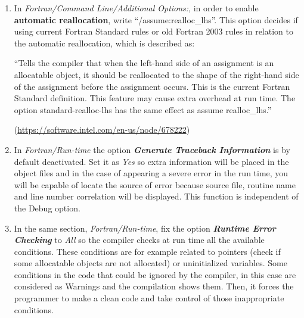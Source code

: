 \begin{enumerate}
    \item In \textit{Fortran/Command Line/Additional Options:}, in order to enable \textbf{automatic reallocation}, write ``/assume:realloc\_lhs''. This option decides if using current Fortran Standard rules or old Fortran 2003 rules in relation to the automatic reallocation, which is described as:
    
    \begin{center}
        \begin{minipage}{0.7\linewidth}
            \vspace{5pt}
            {\small
                ``Tells the compiler that when the left-hand side of an assignment is an allocatable object, it should be reallocated to the shape of the right-hand side of the assignment before the assignment occurs. This is the current Fortran Standard definition. This feature may cause extra overhead at run time. The option standard-realloc-lhs has the same effect as assume realloc\_lhs.''
            }
            \begin{flushright}
                (\url{https://software.intel.com/en-us/node/678222})
            \end{flushright}
            \vspace{5pt}
        \end{minipage}
    \end{center}



    \item In \textit{Fortran/Run-time} the option \textbf{\textit{Generate Traceback Information}} is by default deactivated. Set it as \textit{Yes} so extra information will be placed in the object files and in the case of appearing a severe error in the run time, you will be capable of locate the source of error because source file, routine name and line number correlation will be displayed. This function is independent of the Debug option.
    
    \item In the same section, \textit{Fortran/Run-time}, fix the option \textbf{\textit{Runtime Error Checking}} to \textit{All} so the compiler checks at run time all the available conditions. These conditions are for example related to pointers (check if some allocatable objects are not allocated) or uninitialized variables. Some conditions in the code that could be ignored by the compiler, in this case are considered as Warnings and the compilation shows them. Then, it forces the programmer to make a clean code and take control of those inappropriate conditions. 
    

\end{enumerate}

